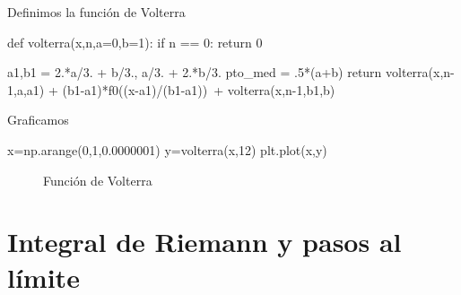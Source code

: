Definimos la función de Volterra
\begin{pyverbatim}
def volterra(x,n,a=0,b=1):
    if n == 0:
        return 0
    
    a1,b1 = 2.*a/3. + b/3., a/3. + 2.*b/3.
    pto_med = .5*(a+b)
    return volterra(x,n-1,a,a1) + (b1-a1)*f0((x-a1)/(b1-a1))\
    + volterra(x,n-1,b1,b)
\end{pyverbatim}

Graficamos

\begin{pyverbatim}
x=np.arange(0,1,0.0000001)
y=volterra(x,12)
plt.plot(x,y)
\end{pyverbatim}


 \begin{figure}[h]
 \begin{center}
 \caption{Función de Volterra}
\end{center}
 \end{figure}


\section{Integral de Riemann y pasos al límite}

